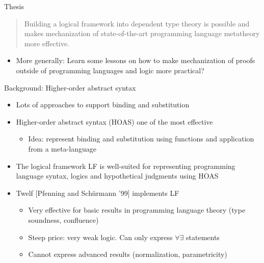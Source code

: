 \documentclass[usenames,dvipsnames]{beamer}
\begin{document}
\begin{frame}{Thesis}
\begin{quote}Building a logical framework into dependent type
theory is possible and makes mechanization of state-of-the-art programming
language metatheory more effective.
\end{quote}
\begin{itemize}
\pause
\item More generally: Learn some lessons on how
to make mechanization of proofs outside of programming languages and
logic more practical?
\end{itemize}
\end{frame}

\begin{frame}{Background: Higher-order abstract syntax}
\begin{itemize}
\item Lots of approaches to support binding and substitution
\item Higher-order abstract syntax (HOAS) one of the most effective
\begin{itemize}
\item Idea: represent binding and substitution using functions and application from a meta-language
\end{itemize}
\item The logical framework LF is well-suited for representing
programming language syntax, logics and hypothetical
judgments using HOAS
\item Twelf [Pfenning and Sch\"urmann '99] implements LF
\begin{itemize}
\item Very effective for basic results in programming language theory (type soundness, confluence)
\item Steep price: very weak logic. Can only express $\forall\exists$ statements
\item Cannot express advanced results (normalization, parametricity)
\end{itemize}
\end{itemize}
\end{frame}
\end{document}
